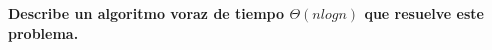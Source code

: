 \textbf{Describe un algoritmo voraz de tiempo $\Theta(n log n)$ que resuelve este problema.}\vspace{.2cm}

\textcolor{bibi}{}
\begin{quote}
\end{quote}